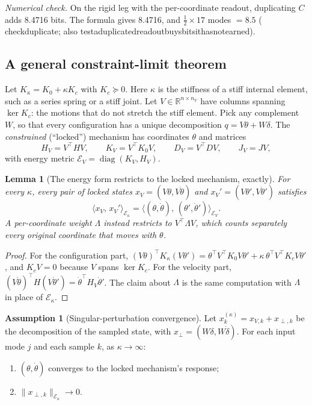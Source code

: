 \documentclass[11pt]{article}
\newtheorem{lemma}[theorem]{Lemma}
\theoremstyle{definition}
\newtheorem{assumption}{Assumption}
\theoremstyle{remark}
\newcommand{\R}{\mathbb{R}}
\newcommand{\diag}{\operatorname{diag}}
\newcommand{\Em}{\mathcal{E}}         %
\newcommand{\ip}[2]{\langle #1,\,#2\rangle}
\newcommand{\codeus}{\textunderscore\allowbreak}
\newcommand{\code}[1]{{\ttfamily\let\_\codeus\hyphenchar\font=-1 #1}}
\newcommand{\checked}[1]{\par\smallskip\noindent\textit{Numerical check.} #1\par}
\begin{document}
\checked{On the rigid leg with the per-coordinate readout, duplicating $C$ adds 8.4716
bits. The formula gives 8.4716, and $\frac12\times17$ modes $=8.5$
(\code{check\_duplicate}; also
\code{test\_a\_duplicated\_readout\_buys\_bits\_it\_has\_not\_earned}).}

\subsection{A general constraint-limit theorem}

Let $K_\kappa=K_0+\kappa K_c$ with $K_c\succeq0$. Here $\kappa$ is the stiffness of a
stiff internal element, such as a series spring or a stiff joint. Let $V\in\R^{n\times
n_V}$ have columns spanning $\ker K_c$: the motions that do not stretch the stiff element.
Pick any complement $W$, so that every configuration has a unique decomposition
$q=V\theta+W\delta$. The \emph{constrained} (``locked'') mechanism has coordinates
$\theta$ and matrices
\[
  H_V=V^\top HV,\qquad K_V=V^\top K_0V,\qquad D_V=V^\top DV,\qquad J_V=JV,
\]
with energy metric $\Em_V=\diag(K_V,H_V)$.

\begin{lemma}[The energy form restricts to the locked mechanism, exactly]\label{lem:restrict}
For every $\kappa$, every pair of locked states $x_V=(V\theta,V\dot\theta)$ and
$x_V'=(V\theta',V\dot\theta')$ satisfies
\[
  \ip{x_V}{x_V'}_{\Em_\kappa}=\ip{(\theta,\dot\theta)}{(\theta',\dot\theta')}_{\Em_V}.
\]
A per-coordinate weight $\Lambda$ instead restricts to $V^\top\Lambda V$, which counts
separately every original coordinate that moves with $\theta$.
\end{lemma}
\begin{proof}
For the configuration part,
$(V\theta)^\top K_\kappa(V\theta')=\theta^\top V^\top K_0V\theta'+\kappa\,\theta^\top
V^\top K_cV\theta'$, and $K_cV=0$ because $V$ spans $\ker K_c$. For the velocity part,
$(V\dot\theta)^\top H(V\dot\theta')=\dot\theta^\top H_V\dot\theta'$. The claim about
$\Lambda$ is the same computation with $\Lambda$ in place of $\Em_\kappa$.
\end{proof}

\begin{assumption}[Singular-perturbation convergence]\label{ass:sp}
Let $x^{(\kappa)}_k=x_{V,k}+x_{\perp,k}$ be the decomposition of the sampled state, with
$x_{\perp}=(W\delta,W\dot\delta)$. For each input mode $j$ and each sample $k$, as
$\kappa\to\infty$:
\begin{enumerate}[label=(\roman*),nosep]
  \item $(\theta,\dot\theta)$ converges to the locked mechanism's response;
  \item $\|x_{\perp,k}\|_{\Em_\kappa}\to0$.
\end{enumerate}
\end{assumption}
\end{document}
